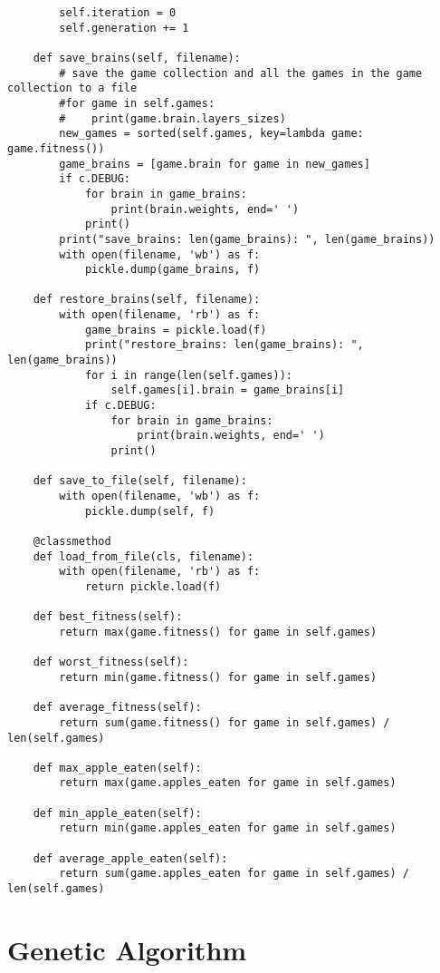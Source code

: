 \documentclass[11pt,a4paper]{article}
\begin{document}
\begin{verbatim}
        self.iteration = 0
        self.generation += 1

    def save_brains(self, filename):
        # save the game collection and all the games in the game collection to a file
        #for game in self.games:
        #    print(game.brain.layers_sizes)
        new_games = sorted(self.games, key=lambda game: game.fitness())
        game_brains = [game.brain for game in new_games]
        if c.DEBUG:
            for brain in game_brains:
                print(brain.weights, end=' ')
            print()
        print("save_brains: len(game_brains): ", len(game_brains))
        with open(filename, 'wb') as f:
            pickle.dump(game_brains, f)

    def restore_brains(self, filename):
        with open(filename, 'rb') as f:
            game_brains = pickle.load(f)
            print("restore_brains: len(game_brains): ", len(game_brains))
            for i in range(len(self.games)):
                self.games[i].brain = game_brains[i]
            if c.DEBUG:
                for brain in game_brains:
                    print(brain.weights, end=' ')
                print()

    def save_to_file(self, filename):
        with open(filename, 'wb') as f:
            pickle.dump(self, f)

    @classmethod
    def load_from_file(cls, filename):
        with open(filename, 'rb') as f:
            return pickle.load(f)

    def best_fitness(self):
        return max(game.fitness() for game in self.games)

    def worst_fitness(self):
        return min(game.fitness() for game in self.games)

    def average_fitness(self):
        return sum(game.fitness() for game in self.games) / len(self.games)

    def max_apple_eaten(self):
        return max(game.apples_eaten for game in self.games)

    def min_apple_eaten(self):
        return min(game.apples_eaten for game in self.games)

    def average_apple_eaten(self):
        return sum(game.apples_eaten for game in self.games) / len(self.games)

\end{verbatim}

\section{Genetic Algorithm}
\end{document}
